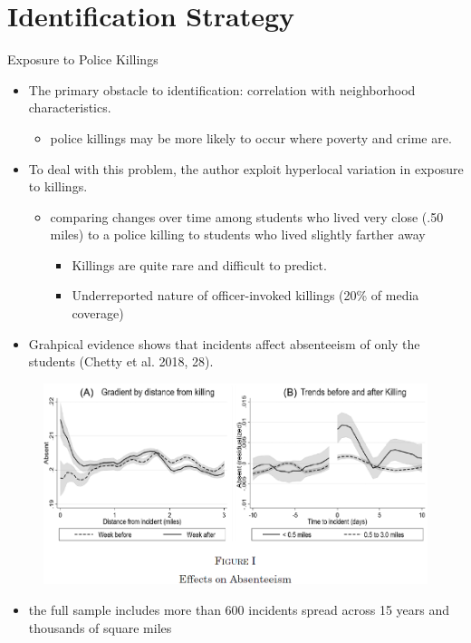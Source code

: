 \documentclass[dvipdfmx]{beamer}
\begin{document}
\section{Identification Strategy}
\frame{\sectionpage}

\begin{frame}{Exposure to Police Killings}
  \begin{itemize}
    \item The primary obstacle to identification: correlation with neighborhood characteristics.
    \begin{itemize}
      \item police killings may be more likely to occur where poverty and crime are.
    \end{itemize}
    \item To deal with this problem, the author exploit hyperlocal variation in exposure to killings.
    \begin{itemize}
      \item comparing changes over time among students who lived very close (.50 miles) to a police killing to students who lived slightly farther away
      \begin{itemize}
        \item Killings are quite rare and difficult to predict.
        \item Underreported nature of officer-invoked killings (20\% of media coverage)
      \end{itemize}
    \end{itemize}
    \item Grahpical evidence shows that incidents affect absenteeism of only the students (Chetty et al. 2018, 28).
  \end{itemize}
\end{frame}

\begin{frame}{}
  \begin{figure}
    \centering
    \includegraphics[scale = .6]{fig_tab/os20220113/F1}
  \end{figure}
  \begin{itemize}
    \item the full sample includes more than 600 incidents spread across 15 years and thousands of square miles
  \end{itemize}
\end{frame}
\end{document}
